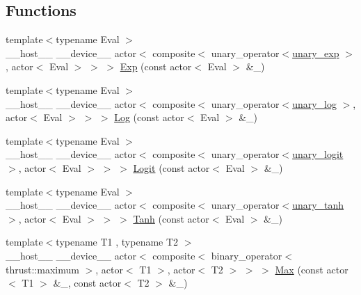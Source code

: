 \subsection*{Functions}
\begin{DoxyCompactItemize}
\item 
{\footnotesize template$<$typename Eval $>$ }\\\+\_\+\+\_\+host\+\_\+\+\_\+ \+\_\+\+\_\+device\+\_\+\+\_\+ actor$<$ composite$<$ unary\+\_\+operator$<$\hyperlink{structthrust_1_1detail_1_1functional_1_1unary__exp}{unary\+\_\+exp} $>$, actor$<$ Eval $>$ $>$ $>$ \hyperlink{namespacethrust_1_1detail_1_1functional_a7ea3d852a4a359ba9c87ce76ea3fcbb2}{Exp} (const actor$<$ Eval $>$ \&\+\_)
\item 
{\footnotesize template$<$typename Eval $>$ }\\\+\_\+\+\_\+host\+\_\+\+\_\+ \+\_\+\+\_\+device\+\_\+\+\_\+ actor$<$ composite$<$ unary\+\_\+operator$<$\hyperlink{structthrust_1_1detail_1_1functional_1_1unary__log}{unary\+\_\+log} $>$, actor$<$ Eval $>$ $>$ $>$ \hyperlink{namespacethrust_1_1detail_1_1functional_ac56289767601dbca61bebee343b4fc89}{Log} (const actor$<$ Eval $>$ \&\+\_)
\item 
{\footnotesize template$<$typename Eval $>$ }\\\+\_\+\+\_\+host\+\_\+\+\_\+ \+\_\+\+\_\+device\+\_\+\+\_\+ actor$<$ composite$<$ unary\+\_\+operator$<$\hyperlink{structthrust_1_1detail_1_1functional_1_1unary__logit}{unary\+\_\+logit} $>$, actor$<$ Eval $>$ $>$ $>$ \hyperlink{namespacethrust_1_1detail_1_1functional_ab1596ca6efb2753919fc577c76541fd3}{Logit} (const actor$<$ Eval $>$ \&\+\_)
\item 
{\footnotesize template$<$typename Eval $>$ }\\\+\_\+\+\_\+host\+\_\+\+\_\+ \+\_\+\+\_\+device\+\_\+\+\_\+ actor$<$ composite$<$ unary\+\_\+operator$<$\hyperlink{structthrust_1_1detail_1_1functional_1_1unary__tanh}{unary\+\_\+tanh} $>$, actor$<$ Eval $>$ $>$ $>$ \hyperlink{namespacethrust_1_1detail_1_1functional_a565a36ed831a74fec50b00c921f669ba}{Tanh} (const actor$<$ Eval $>$ \&\+\_)
\item 
{\footnotesize template$<$typename T1 , typename T2 $>$ }\\\+\_\+\+\_\+host\+\_\+\+\_\+ \+\_\+\+\_\+device\+\_\+\+\_\+ actor$<$ composite$<$ binary\+\_\+operator$<$thrust\+::maximum $>$, actor$<$ T1 $>$, actor$<$ T2 $>$ $>$ $>$ \hyperlink{namespacethrust_1_1detail_1_1functional_a2249ce1e61c19c18fed1d15a9ee5cffb}{Max} (const actor$<$ T1 $>$ \&\+\_, const actor$<$ T2 $>$ \&\+\_)

\end{DoxyCompactItemize}

